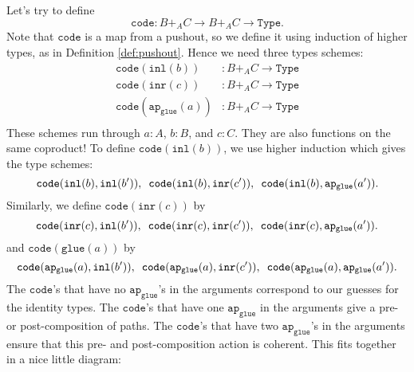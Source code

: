 \documentclass[12pt]{amsart}
\newcommand{\from}{\colon}
\newcommand{\tin}{\colon}
\newcommand{\type}[1]{\mathtt{#1}}
\theoremstyle{remark}
\theoremstyle{definition}
\begin{document}
Let's try to define 
\[
	\type{code} \from 
	B +_A C \to B +_A C \to \type{Type}.
\]  
Note that $\type{code}$ is a map from a pushout, 
so we define it using induction of higher types, 
as in Definition \ref{def:pushout}.
Hence we need three types schemes:
\begin{align*}
	\type{code}(\type{inl}(b)) & \from B +_A C \to \type{Type} \\
	\type{code}(\type{inr}(c)) & \from B +_A C \to \type{Type} \\
	\type{code}(\type{ap_{glue}}(a)) & \from B +_A C \to \type{Type} \\
\end{align*}
These schemes run through 
$a \tin A$, $b \tin B$, and $c \tin C$.  
They are also functions on the same coproduct!
To define $\type{code}(\type{inl}(b))$, 
we use higher induction which gives the type schemes:
\[
	\type{code}(\type{inl}(b),\type{inl}(b')), \hspace{0.5em}
	\type{code}(\type{inl}(b),\type{inr}(c')), \hspace{0.5em}
	\type{code}(\type{inl}(b),\type{ap_{glue}}(a')).
\]
Similarly, we define $\type{code}(\type{inr}(c))$ by
\[
	\type{code}(\type{inr}(c),\type{inl}(b')), \hspace{0.5em}
	\type{code}(\type{inr}(c),\type{inr}(c')) , \hspace{0.5em}
	\type{code}(\type{inr}(c),\type{ap_{glue}}(a')).
\]
and $\type{code}(\type{glue}(a))$ by 
\[
	\type{code}(\type{ap_{glue}}(a),\type{inl}(b')), \hspace{0.5em}
	\type{code}(\type{ap_{glue}}(a),\type{inr}(c')) , \hspace{0.5em} 
	\type{code}(\type{ap_{glue}}(a),\type{ap_{glue}}(a')).
\]
The $\type{code}$'s that have 
no $\type{ap_{glue}}$'s in the arguments 
correspond to our guesses
for the identity types.
The $\type{code}$'s that have 
one $\type{ap_{glue}}$ in the arguments
give a pre- or post-composition
of paths.
The $\type{code}$'s that have 
two $\type{ap_{glue}}$'s in the arguments  
ensure that this pre- and post-composition
action is coherent.
This fits together in a nice little 
diagram:
\end{document}
